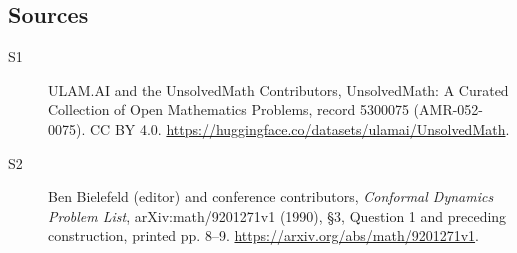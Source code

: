 \documentclass[11pt]{article}
\begin{document}
\subsection{Sources}
\begin{description}
\item[\hypertarget{source:5300075:1}{S1}] ULAM.AI and the UnsolvedMath Contributors, UnsolvedMath: A Curated Collection of Open Mathematics Problems, record 5300075 (AMR-052-0075). CC BY 4.0. \url{https://huggingface.co/datasets/ulamai/UnsolvedMath}.
\item[\hypertarget{source:5300075:2}{S2}] Ben Bielefeld (editor) and conference contributors, \emph{Conformal Dynamics Problem List}, arXiv:math/9201271v1 (1990), \S3, Question 1 and preceding construction, printed pp. 8--9. \url{https://arxiv.org/abs/math/9201271v1}.
\end{description}
\label{end:5300075}
\end{document}
